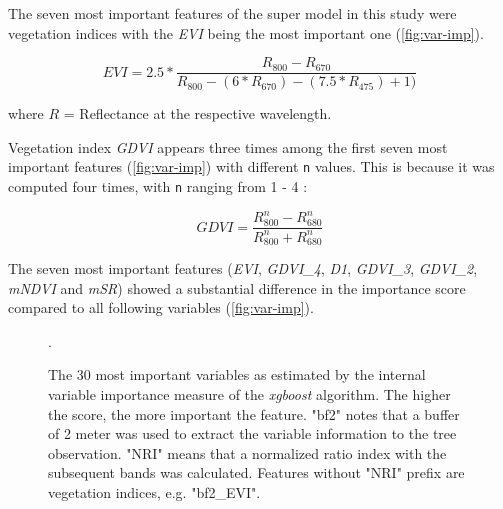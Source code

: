 \documentclass[review]{elsarticle}
\begin{document}
\noindent The seven most important features of the super model in this study were vegetation indices with the \textit{EVI} \citep{hueteComparisonVegetationIndices1997} being the most important one (\autoref{fig:var-imp}).

\begin{equation}
	EVI = 2.5*\frac{R_{800}-R_{670}}{R_{800}-(6*R_{670})-(7.5*R_{475})+1)}
\end{equation}

\noindent where $R$ = Reflectance at the respective wavelength.

\bigbreak

\noindent Vegetation index \textit{GDVI} appears three times among the first seven most important features (\autoref{fig:var-imp}) with different \texttt{n} values.
This is because it was computed four times, with \texttt{n} ranging from 1 - 4 \citep{wuEstimatingChlorophyllContent2008}:

\begin{equation}
	GDVI = \frac{R_{800}^n-R_{680}^n}{R_{800}^n+R_{680}^n}
\end{equation}

\bigbreak

\noindent The seven most important features (\textit{EVI}, \textit{GDVI\_4}, \textit{D1}, \textit{GDVI\_3}, \textit{GDVI\_2}, \textit{mNDVI} and \textit{mSR}) showed a substantial difference in the importance score compared to all following variables (\autoref{fig:var-imp}).

\begin{figure} [b!]
	\begin{center}
		\caption{The 30 most important variables as estimated by the internal variable importance measure of the \textit{xgboost} algorithm. The higher the score, the more important the feature.
			"bf2" notes that a buffer of 2 meter was used to extract the variable information to the tree observation. "NRI" means that a normalized ratio index with the subsequent bands was calculated. Features without "NRI" prefix are vegetation indices, e.g. "bf2\_EVI".}. %
		\label{fig:var-imp}
	\end{center}
\end{figure}
\end{document}
